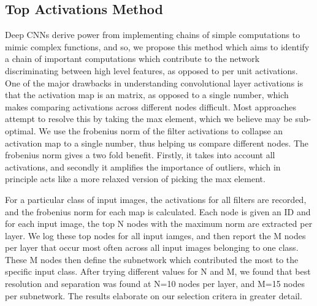 \documentclass[10pt,twocolumn,letterpaper]{article}
\begin{document}
\subsection{Top Activations Method}
Deep CNNs derive power from implementing chains of simple computations to mimic complex functions, and so, we propose this method which aims to identify a chain of important computations which contribute to the network discriminating between high level features, as opposed to per unit activations. One of the major drawbacks in understanding convolutional layer activations is that the activation map is an matrix, as opposed to a single number, which makes comparing activations across different nodes difficult. Most approaches attempt to resolve this by taking the max element, which we believe may be sub-optimal. We use the frobenius norm of the filter activations to collapse an activation map to a single number, thus helping us compare different nodes. The frobenius norm gives a two fold benefit. Firstly, it takes into account all activations, and secondly it amplifies the importance of outliers, which in principle acts like a more relaxed version of picking the max element. 

For a particular class of input images, the activations for all filters are recorded, and the frobenius norm for each map is calculated. Each node is given an ID and for each input image, the top N nodes with the maximum norm are extracted per layer. We log these top nodes for all input iamges, and then report the M nodes per layer that occur most often across all input images belonging to one class. These M nodes then define the subnetwork which contributed the most to the specific input class. After trying different values for N and M, we found that best resolution and separation was found at N=10 nodes per layer, and M=15 nodes per subnetwork. The results elaborate on our selection critera in greater detail.
\end{document}
